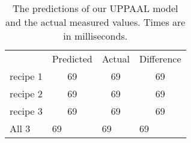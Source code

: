 \begin{table}[]
\centering
\begin{tabular}{cccc}
\multicolumn{1}{l}{}      & \multicolumn{1}{l}{Predicted} & \multicolumn{1}{l}{Actual} & \multicolumn{1}{l}{Difference} \\
recipe 1                  & 69                            & 69                         & 69                             \\
recipe 2                  & 69                            & 69                         & 69                             \\
recipe 3                  & 69                            & 69                         & 69                             \\
\multicolumn{1}{l}{All 3} & \multicolumn{1}{l}{69}        & \multicolumn{1}{l}{69}     & \multicolumn{1}{l}{69}        
\end{tabular}
\caption{The predictions of our UPPAAL model and the actual measured values. Times are in milliseconds.}
\label{tab:cp-result}
\end{table}